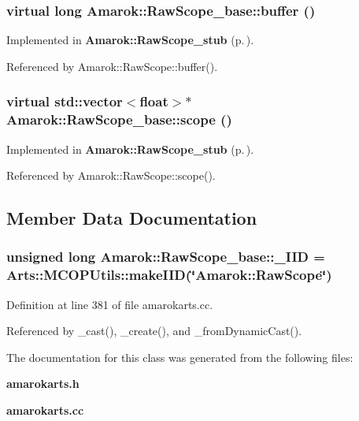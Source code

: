 \subsubsection{\setlength{\rightskip}{0pt plus 5cm}virtual long Amarok::Raw\-Scope\_\-base::buffer ()\hspace{0.3cm}{\tt  [pure virtual]}}\label{classAmarok_1_1RawScope__base_Amarok_1_1RawScope__skela9}




Implemented in {\bf Amarok::Raw\-Scope\_\-stub} {\rm (p.\,\pageref{classAmarok_1_1RawScope__stub_Amarok_1_1RawScope__stuba1})}.

Referenced by Amarok::Raw\-Scope::buffer().
\subsubsection{\setlength{\rightskip}{0pt plus 5cm}virtual std::vector$<$float$>$$\ast$ Amarok::Raw\-Scope\_\-base::scope ()\hspace{0.3cm}{\tt  [pure virtual]}}\label{classAmarok_1_1RawScope__base_Amarok_1_1RawScope__skela11}




Implemented in {\bf Amarok::Raw\-Scope\_\-stub} {\rm (p.\,\pageref{classAmarok_1_1RawScope__stub_Amarok_1_1RawScope__stuba3})}.

Referenced by Amarok::Raw\-Scope::scope().

\subsection{Member Data Documentation}
\subsubsection{\setlength{\rightskip}{0pt plus 5cm}unsigned long {\bf Amarok::Raw\-Scope\_\-base::\_\-IID} = Arts::MCOPUtils::make\-IID(\char`\"{}Amarok::Raw\-Scope\char`\"{})\hspace{0.3cm}{\tt  [static]}}\label{classAmarok_1_1RawScope__base_Amarok_1_1RawScope__stubs0}




Definition at line 381 of file amarokarts.cc.

Referenced by \_\-cast(), \_\-create(), and \_\-from\-Dynamic\-Cast().

The documentation for this class was generated from the following files:\begin{CompactItemize}
\item 
{\bf amarokarts.h}\item 
{\bf amarokarts.cc}\end{CompactItemize}
